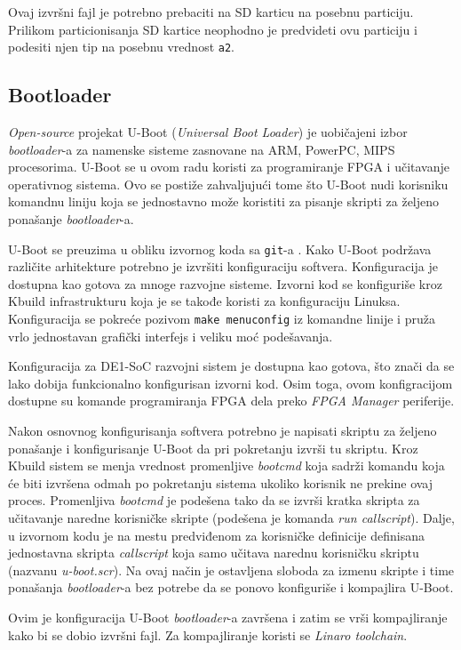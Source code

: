 Ovaj izvršni fajl je potrebno prebaciti na SD karticu na posebnu particiju. Prilikom particionisanja SD kartice neophodno je predvideti ovu particiju i podesiti njen tip na posebnu vrednost \texttt{a2}.

\subsection{Bootloader}
\textit{Open-source} projekat U-Boot (\textit{Universal Boot Loader}) je uobičajeni izbor \textit{bootloader}-a za namenske sisteme zasnovane na ARM, PowerPC, MIPS procesorima. U-Boot se u ovom radu koristi za programiranje FPGA i učitavanje operativnog sistema. Ovo se postiže zahvaljujući tome što U-Boot nudi korisniku komandnu liniju koja se jednostavno može koristiti za pisanje skripti za željeno ponašanje \textit{bootloader}-a.

U-Boot se preuzima u obliku izvornog koda sa \texttt{git}-a \cite{gituboot}. Kako U-Boot podržava različite arhitekture potrebno je izvršiti konfiguraciju softvera. Konfiguracija je dostupna kao gotova za mnoge razvojne sisteme. Izvorni kod se konfiguriše kroz Kbuild infrastrukturu koja je se takođe koristi za konfiguraciju Linuksa. Konfiguracija se pokreće pozivom \texttt{make menuconfig} iz komandne linije i pruža vrlo jednostavan grafički interfejs i veliku moć podešavanja.

Konfiguracija za DE1-SoC razvojni sistem je dostupna kao gotova, što znači da se lako dobija funkcionalno konfigurisan izvorni kod. Osim toga, ovom konfigracijom dostupne su komande programiranja FPGA dela preko \textit{FPGA Manager} periferije.

Nakon osnovnog konfigurisanja softvera potrebno je napisati skriptu za željeno ponašanje i konfigurisanje U-Boot da pri pokretanju izvrši tu skriptu. Kroz Kbuild sistem se menja vrednost promenljive \textit{bootcmd} koja sadrži komandu koja će biti izvršena odmah po pokretanju sistema ukoliko korisnik ne prekine ovaj proces. Promenljiva \textit{bootcmd} je podešena tako da se izvrši kratka skripta za učitavanje naredne korisničke skripte (podešena je komanda \textit{run callscript}). Dalje, u izvornom kodu je na mestu predviđenom za korisničke definicije definisana jednostavna skripta \textit{callscript} koja samo učitava narednu korisničku skriptu (nazvanu \textit{u-boot.scr}). Na ovaj način je ostavljena sloboda za izmenu skripte i time ponašanja \textit{bootloader}-a bez potrebe da se ponovo konfiguriše i kompajlira U-Boot.

Ovim je konfiguracija U-Boot \textit{bootloader}-a završena i zatim se vrši kompajliranje kako bi se dobio izvršni fajl. Za kompajliranje koristi se \textit{Linaro toolchain}.
